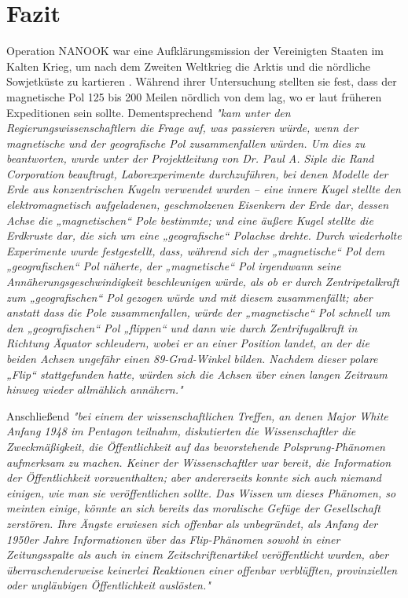 \documentclass[10pt,twocolumn,letterpaper]{article}
\begin{document}
\section{Fazit}

Operation NANOOK war eine Aufklärungsmission der Vereinigten Staaten im Kalten Krieg, um nach dem Zweiten Weltkrieg die Arktis und die nördliche Sowjetküste zu kartieren \cite{137}. Während ihrer Untersuchung stellten sie fest, dass der magnetische Pol 125 bis 200 Meilen nördlich von dem lag, wo er laut früheren Expeditionen sein sollte. Dementsprechend \textit{"kam unter den Regierungswissenschaftlern die Frage auf, was passieren würde, wenn der magnetische und der geografische Pol zusammenfallen würden. Um dies zu beantworten, wurde unter der Projektleitung von Dr. Paul A. Siple die Rand Corporation beauftragt, Laborexperimente durchzuführen, bei denen Modelle der Erde aus konzentrischen Kugeln verwendet wurden – eine innere Kugel stellte den elektromagnetisch aufgeladenen, geschmolzenen Eisenkern der Erde dar, dessen Achse die „magnetischen“ Pole bestimmte; und eine äußere Kugel stellte die Erdkruste dar, die sich um eine „geografische“ Polachse drehte. Durch wiederholte Experimente wurde festgestellt, dass, während sich der „magnetische“ Pol dem „geografischen“ Pol näherte, der „magnetische“ Pol irgendwann seine Annäherungsgeschwindigkeit beschleunigen würde, als ob er durch Zentripetalkraft zum „geografischen“ Pol gezogen würde und mit diesem zusammenfällt; aber anstatt dass die Pole zusammenfallen, würde der „magnetische“ Pol schnell um den „geografischen“ Pol „flippen“ und dann wie durch Zentrifugalkraft in Richtung Äquator schleudern, wobei er an einer Position landet, an der die beiden Achsen ungefähr einen 89-Grad-Winkel bilden. Nachdem dieser polare „Flip“ stattgefunden hatte, würden sich die Achsen über einen langen Zeitraum hinweg wieder allmählich annähern."} \cite{138,139}

Anschließend \textit{"bei einem der wissenschaftlichen Treffen, an denen Major White Anfang 1948 im Pentagon teilnahm, diskutierten die Wissenschaftler die Zweckmäßigkeit, die Öffentlichkeit auf das bevorstehende Polsprung-Phänomen aufmerksam zu machen. Keiner der Wissenschaftler war bereit, die Information der Öffentlichkeit vorzuenthalten; aber andererseits konnte sich auch niemand einigen, wie man sie veröffentlichen sollte. Das Wissen um dieses Phänomen, so meinten einige, könnte an sich bereits das moralische Gefüge der Gesellschaft zerstören. Ihre Ängste erwiesen sich offenbar als unbegründet, als Anfang der 1950er Jahre Informationen über das Flip-Phänomen sowohl in einer Zeitungsspalte als auch in einem Zeitschriftenartikel veröffentlicht wurden, aber überraschenderweise keinerlei Reaktionen einer offenbar verblüfften, provinziellen oder ungläubigen Öffentlichkeit auslösten."} \cite{138,139}
\end{document}
